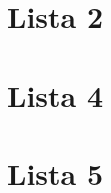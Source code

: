 \documentclass[svgnames]{report}
\begin{document}

\chapter{Lista 2}



\chapter{Lista 4}

\chapter{Lista 5}
\end{document}
